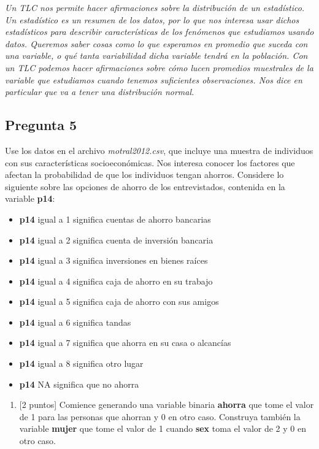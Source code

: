 \documentclass[
  letterpaper,
  DIV=11,
  numbers=noendperiod]{scrartcl}
\providecommand{\tightlist}{%
  \setlength{\itemsep}{0pt}\setlength{\parskip}{0pt}}\usepackage{longtable,booktabs,array}
\begin{document}
\emph{Un TLC nos permite hacer afirmaciones sobre la distribución de un
estadístico. Un estadístico es un resumen de los datos, por lo que nos
interesa usar dichos estadísticos para describir características de los
fenómenos que estudiamos usando datos. Queremos saber cosas como lo que
esperamos en promedio que suceda con una variable, o qué tanta
variabilidad dicha variable tendrá en la población. Con un TLC podemos
hacer afirmaciones sobre cómo lucen promedios muestrales de la variable
que estudiamos cuando tenemos suficientes observaciones. Nos dice en
particular que va a tener una distribución normal.}

\hypertarget{pregunta-5}{%
\subsection{Pregunta 5}\label{pregunta-5}}

Use los datos en el archivo \emph{motral2012.csv}, que incluye una
muestra de individuos con sus características socioeconómicas. Nos
interesa conocer los factores que afectan la probabilidad de que los
individuos tengan ahorros. Considere lo siguiente sobre las opciones de
ahorro de los entrevistados, contenida en la variable \textbf{p14}:

\begin{itemize}
\tightlist
\item
  \textbf{p14} igual a 1 significa cuentas de ahorro bancarias
\item
  \textbf{p14} igual a 2 significa cuenta de inversión bancaria
\item
  \textbf{p14} igual a 3 significa inversiones en bienes raíces
\item
  \textbf{p14} igual a 4 significa caja de ahorro en su trabajo
\item
  \textbf{p14} igual a 5 significa caja de ahorro con sus amigos
\item
  \textbf{p14} igual a 6 significa tandas
\item
  \textbf{p14} igual a 7 significa que ahorra en su casa o alcancías
\item
  \textbf{p14} igual a 8 significa otro lugar
\item
  \textbf{p14} NA significa que no ahorra
\end{itemize}

\begin{enumerate}
\def\labelenumi{\alph{enumi}.}
\tightlist
\item
  {[}2 puntos{]} Comience generando una variable binaria \textbf{ahorra}
  que tome el valor de 1 para las personas que ahorran y 0 en otro caso.
  Construya también la variable \textbf{mujer} que tome el valor de 1
  cuando \textbf{sex} toma el valor de 2 y 0 en otro caso.
\end{enumerate}
\end{document}
